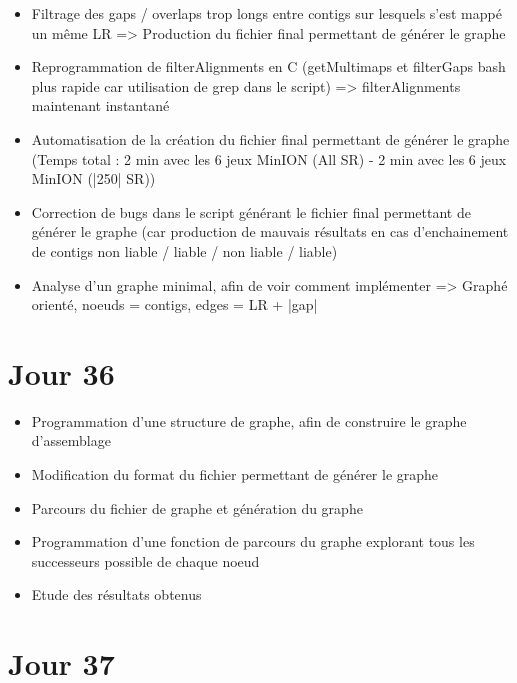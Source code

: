 \documentclass[12pt]{report}
\begin{document}
\begin{itemize}
	\item Filtrage des gaps / overlaps trop longs entre contigs sur lesquels s'est mappé un même LR => Production du fichier final permettant
	de générer le graphe
	
	\item Reprogrammation de filterAlignments en C (getMultimaps et filterGaps bash plus rapide car utilisation de grep dans le
	script) => filterAlignments maintenant instantané
	
	\item Automatisation de la création du fichier final permettant de générer le graphe
	(Temps total : 2 min avec les 6 jeux MinION (All SR) - 2 min avec les 6 jeux MinION (|250| SR))
	
	\item Correction de bugs dans le script générant le fichier final permettant de générer le graphe (car production de mauvais résultats
	en cas d'enchainement de contigs non liable / liable / non liable / liable)
	
	\item Analyse d'un graphe minimal, afin de voir comment implémenter => Graphé orienté, noeuds = contigs, edges = LR + |gap|
\end{itemize}

\section{Jour 36}

\begin{itemize}
	\item Programmation d'une structure de graphe, afin de construire le graphe d'assemblage
	
	\item Modification du format du fichier permettant de générer le graphe
	
	\item Parcours du fichier de graphe et génération du graphe
	
	\item Programmation d'une fonction de parcours du graphe explorant tous les successeurs possible de chaque noeud
	
	\item Etude des résultats obtenus
\end{itemize}

\section{Jour 37}
\end{document}
